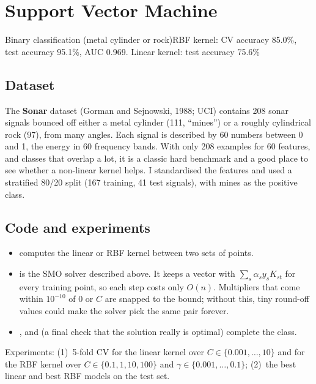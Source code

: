 \chapter{Support Vector Machine}

{Binary classification (metal cylinder or rock)}{RBF kernel: CV accuracy 85.0\%, test accuracy 95.1\%,
AUC 0.969. Linear kernel: test accuracy 75.6\%}

\section{Dataset}
The \textbf{Sonar} dataset (Gorman and Sejnowski, 1988; UCI) contains 208 sonar signals bounced off either
a metal cylinder (111, ``mines'') or a roughly cylindrical rock (97), from many angles. Each signal is
described by 60 numbers between 0 and 1, the energy in 60 frequency bands. With only 208 examples for 60
features, and classes that overlap a lot, it is a classic hard benchmark and a good place to see whether
a non-linear kernel helps. I standardised the features and used a stratified 80/20 split (167 training,
41 test signals), with mines as the positive class.

\section{Code and experiments}
\begin{itemize}
\item {} computes the linear or RBF kernel between two sets of points.
\item {} is the SMO solver described above. It keeps a vector  with
      $\sum_s\alpha_sy_sK_{st}$ for every training point, so each step costs only $O(n)$. Multipliers that
      come within $10^{-10}$ of 0 or $C$ are snapped to the bound; without this, tiny round-off values
      could make the solver pick the same pair forever.
\item {},  and  (a final check that the
      solution really is optimal) complete the class.
\end{itemize}
\noindent Experiments: (1)~5-fold CV for the linear kernel over $C\in\{0.001,\dots,10\}$ and for the RBF
kernel over $C\in\{0.1,1,10,100\}$ and $\gamma\in\{0.001,\dots,0.1\}$; (2)~the best linear and best RBF
models on the test set.

